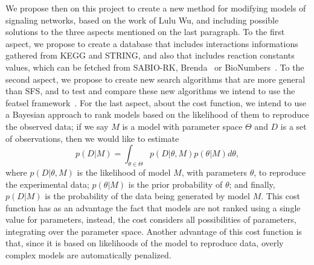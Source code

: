 We propose then on this project to create a new method for modifying 
models of signaling networks, based on the work of Lulu Wu, and 
including possible solutions to the three aspects mentioned on the last 
paragraph. To the first aspect, we propose to create a database that 
includes interactions informations gathered from KEGG and STRING, and 
also that includes reaction constants values, which can be fetched from
SABIO-RK, Brenda~\cite{Schomburg2004} or BioNumbers~\cite{Milo2009}. To
the second aspect, we propose to create new search algorithms that are
more general than SFS, and to test and compare these new algorithms we
intend to use the featsel framework~\cite{REIS2017193}. For the last 
aspect, about the cost function, we intend to use a Bayesian approach to
rank models based on the likelihood of them to reproduce the observed 
data; if we say $M$ is a model with parameter space $\Theta$ and $D$ is 
a set of observations, then we would like to estimate 
\begin{equation*}
p (D|M) = \int_{\theta \in \Theta} p (D | \theta, M)p(\theta | M)d\theta, 
\end{equation*}
where $p (D|\theta, M)$ is the likelihood of model $M$, with parameters
$\theta$, to reproduce the experimental data; $p(\theta|M)$ is the
prior probability of $\theta$; and finally, $p (D|M)$ is the probability 
of the data being generated by model $M$. This cost function has as an 
advantage the fact that models are not ranked using a single value for 
parameters, instead, the cost considers all possibilities of parameters, 
integrating over the parameter space. Another advantage of this cost 
function is that, since it is based on likelihoods of the model to 
reproduce data, overly complex models are automatically penalized.
